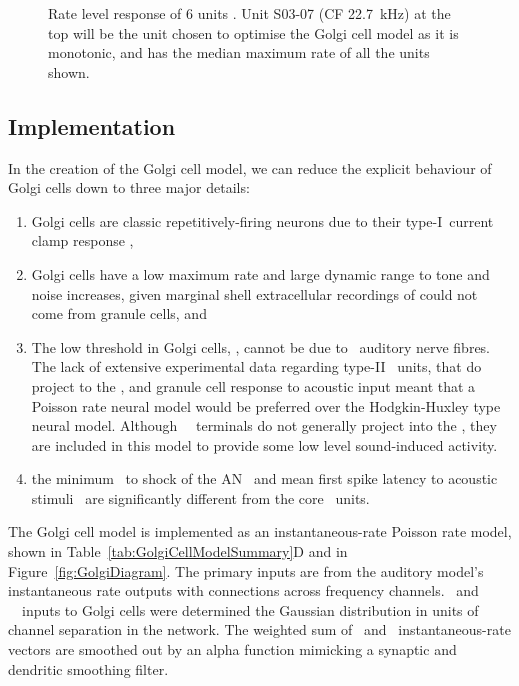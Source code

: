 
\begin{figure}[htp!]
   \centering
  \caption[Rate level response of marginal shell units]{Rate level response of 6 units \citep[Reproduced with permission Fig.~2]{GhoshalKim:1997}.
Unit S03-07 (CF 22.7~kHz) at the top will be the unit chosen to optimise the Golgi cell model as it is monotonic, and has the median maximum rate of all the units shown. \label{fig:GolgiKimFig2}}
\end{figure}

\subsection{Implementation}

In the creation of the Golgi cell model, we can reduce the explicit behaviour of Golgi cells down to three major details:
 \begin{enumerate}
 \item Golgi cells are classic repetitively-firing neurons due to their    type-I~current clamp response \citep{FerragamoGoldingEtAl:1998},
 \item Golgi cells have a low maximum rate and large dynamic range to tone and noise increases, given marginal shell extracellular recordings of \citet{GhoshalKim:1997} could not come from granule cells, and
 \item The low threshold in Golgi cells, \citet{GhoshalKim:1997}, can\-not be due to \LSR~auditory nerve fibres.
The lack of extensive experimental data regarding type-II \ANF~units, that do project to the \GCD, and granule cell response to acoustic input meant that a Poisson rate neural model would be preferred over the Hodgkin-Huxley type neural model.
Although \HSR~\ANF~terminals do not generally project into the \GCD, they are included in this model to provide some low level sound-induced activity.
 \item the minimum \EPSP~to shock of the AN~\citep{FerragamoGoldingEtAl:1998} and mean first spike latency to acoustic stimuli~\citep{GhoshalKim:1997} are significantly different from the core \VCN~units.
 \end{enumerate}



The Golgi cell model is implemented as an instantaneous-rate Poisson rate model, shown in Table~\ref{tab:GolgiCellModelSummary}D and in Figure~\ref{fig:GolgiDiagram}.
The primary inputs are from the auditory model's instantaneous rate outputs with connections across frequency channels.
\HSR~and \LSR~\ANF~inputs to Golgi cells were determined the Gaussian distribution in units of channel separation in the network.
The weighted sum of \HSR~and \LSR~instantaneous-rate vectors are smoothed out by an alpha function mimicking a synaptic and dendritic smoothing filter.

